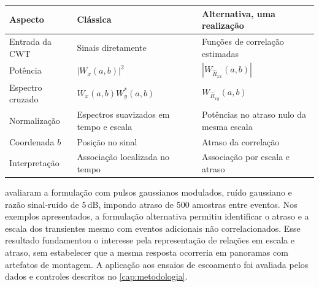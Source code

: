 \begin{quadro}[htb]
  \centering
  \caption{Comparação entre as formulações clássica e alternativa da coerência
           \textit{Wavelet}.}
  \label{qua:wco-comparativo}
  \begin{tabular}{p{3.1cm}p{5.1cm}p{5.1cm}}
    \hline
    \textbf{Aspecto} & \textbf{Clássica} & \textbf{Alternativa, uma realização} \\
    \hline
    Entrada da CWT & Sinais diretamente & Funções de correlação estimadas \\
    Potência & $|W_x(a,b)|^2$ & $|W_{\widehat R_{xx}}(a,b)|$ \\
    Espectro cruzado & $W_x(a,b)W_y^*(a,b)$ & $W_{\widehat R_{xy}}(a,b)$ \\
    Normalização & Espectros suavizados em tempo e escala & Potências no atraso nulo da mesma escala \\
    Coordenada $b$ & Posição no sinal & Atraso da correlação \\
    Interpretação & Associação localizada no tempo & Associação por escala e atraso \\
    \hline
  \end{tabular}
\end{quadro}

 avaliaram a formulação com pulsos gaussianos modulados,
ruído gaussiano e razão sinal-ruído de 5\,dB, impondo atraso de 500 amostras entre
eventos. Nos exemplos apresentados, a formulação alternativa permitiu identificar
o atraso e a escala dos transientes mesmo com eventos adicionais não
correlacionados. Esse resultado fundamentou o interesse pela representação de
relações em escala e atraso, sem estabelecer que a mesma resposta ocorreria em
panoramas com artefatos de montagem. A aplicação aos ensaios de escoamento foi
avaliada pelos dados e controles descritos no \autoref{cap:metodologia}.
